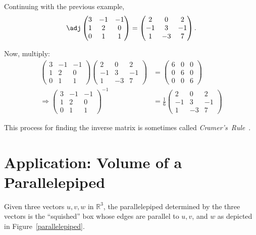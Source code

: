 \begin{example}
Continuing with the previous example,
\[
\adj \begin{pmatrix}
3 & -1 & -1 \\
1 & 2 & 0 \\
0 & 1 & 1 \\
\end{pmatrix} = \begin{pmatrix}
2 & 0 & 2 \\
-1 & 3 & -1 \\
1 & -3 & 7 \\
\end{pmatrix}.
\]

Now, multiply:
\begin{align*}
\begin{pmatrix}
3 & -1 & -1 \\
1 & 2 & 0 \\
0 & 1 & 1
\end{pmatrix}
\begin{pmatrix}
2 & 0 & 2 \\
-1 & 3 & -1 \\
1 & -3 & 7
\end{pmatrix}
&=
\begin{pmatrix}
6 & 0 & 0 \\
0 & 6 & 0 \\
0 & 0 & 6
\end{pmatrix} \\[1mm]
\Rightarrow \begin{pmatrix}
3 & -1 & -1 \\
1 & 2 & 0 \\
0 & 1 & 1
\end{pmatrix}^{-1}
& = \frac{1}{6}\begin{pmatrix}
2 & 0 & 2 \\
-1 & 3 & -1 \\
1 & -3 & 7
\end{pmatrix}
\end{align*}

This process for finding the inverse matrix is sometimes called \emph{Cramer's~Rule}~.
\end{example}

\section{Application: Volume of a Parallelepiped}

Given three vectors $u,v,w$ in $\mathbb{R}^3$, the parallelepiped determined by the three vectors is the ``squished'' box whose edges are parallel to $u, v$, and $w$ as depicted in Figure~\ref{parallelepiped}.

